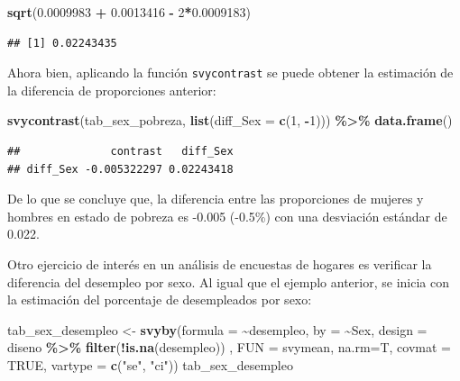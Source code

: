 \documentclass[
  12pt,
]{book}
\newenvironment{Shaded}{\begin{snugshade}}{\end{snugshade}}
\newcommand{\AttributeTok}[1]{\textcolor[rgb]{0.13,0.29,0.53}{#1}}
\newcommand{\ConstantTok}[1]{\textcolor[rgb]{0.56,0.35,0.01}{#1}}
\newcommand{\DecValTok}[1]{\textcolor[rgb]{0.00,0.00,0.81}{#1}}
\newcommand{\FloatTok}[1]{\textcolor[rgb]{0.00,0.00,0.81}{#1}}
\newcommand{\FunctionTok}[1]{\textcolor[rgb]{0.13,0.29,0.53}{\textbf{#1}}}
\newcommand{\NormalTok}[1]{#1}
\newcommand{\OtherTok}[1]{\textcolor[rgb]{0.56,0.35,0.01}{#1}}
\newcommand{\SpecialCharTok}[1]{\textcolor[rgb]{0.81,0.36,0.00}{\textbf{#1}}}
\newcommand{\StringTok}[1]{\textcolor[rgb]{0.31,0.60,0.02}{#1}}
\begin{document}
\begin{Shaded}
\begin{Highlighting}[]
\FunctionTok{sqrt}\NormalTok{(}\FloatTok{0.0009983} \SpecialCharTok{+} \FloatTok{0.0013416} \SpecialCharTok{{-}} \DecValTok{2}\SpecialCharTok{*}\FloatTok{0.0009183}\NormalTok{)}
\end{Highlighting}
\end{Shaded}

\begin{verbatim}
## [1] 0.02243435
\end{verbatim}

Ahora bien, aplicando la función \texttt{svycontrast} se puede obtener la estimación de la diferencia de proporciones anterior:

\begin{Shaded}
\begin{Highlighting}[]
\FunctionTok{svycontrast}\NormalTok{(tab\_sex\_pobreza,}
            \FunctionTok{list}\NormalTok{(}\AttributeTok{diff\_Sex =} \FunctionTok{c}\NormalTok{(}\DecValTok{1}\NormalTok{, }\SpecialCharTok{{-}}\DecValTok{1}\NormalTok{))) }\SpecialCharTok{\%\textgreater{}\%}
  \FunctionTok{data.frame}\NormalTok{()}
\end{Highlighting}
\end{Shaded}

\begin{verbatim}
##              contrast   diff_Sex
## diff_Sex -0.005322297 0.02243418
\end{verbatim}

De lo que se concluye que, la diferencia entre las proporciones de mujeres y hombres en estado de pobreza es -0.005 (-0.5\%) con una desviación estándar de 0.022.

Otro ejercicio de interés en un análisis de encuestas de hogares es verificar la diferencia del desempleo por sexo. Al igual que el ejemplo anterior, se inicia con la estimación del porcentaje de desempleados por sexo:

\begin{Shaded}
\begin{Highlighting}[]
\NormalTok{tab\_sex\_desempleo }\OtherTok{\textless{}{-}} \FunctionTok{svyby}\NormalTok{(}\AttributeTok{formula =} \SpecialCharTok{\textasciitilde{}}\NormalTok{desempleo, }\AttributeTok{by =} \SpecialCharTok{\textasciitilde{}}\NormalTok{Sex, }
                           \AttributeTok{design  =}\NormalTok{ diseno }\SpecialCharTok{\%\textgreater{}\%} \FunctionTok{filter}\NormalTok{(}\SpecialCharTok{!}\FunctionTok{is.na}\NormalTok{(desempleo)) , }
                           \AttributeTok{FUN     =}\NormalTok{ svymean, }\AttributeTok{na.rm=}\NormalTok{T, }\AttributeTok{covmat =} \ConstantTok{TRUE}\NormalTok{,}
                           \AttributeTok{vartype =} \FunctionTok{c}\NormalTok{(}\StringTok{"se"}\NormalTok{, }\StringTok{"ci"}\NormalTok{))}
\NormalTok{tab\_sex\_desempleo}
\end{Highlighting}
\end{Shaded}
\end{document}
